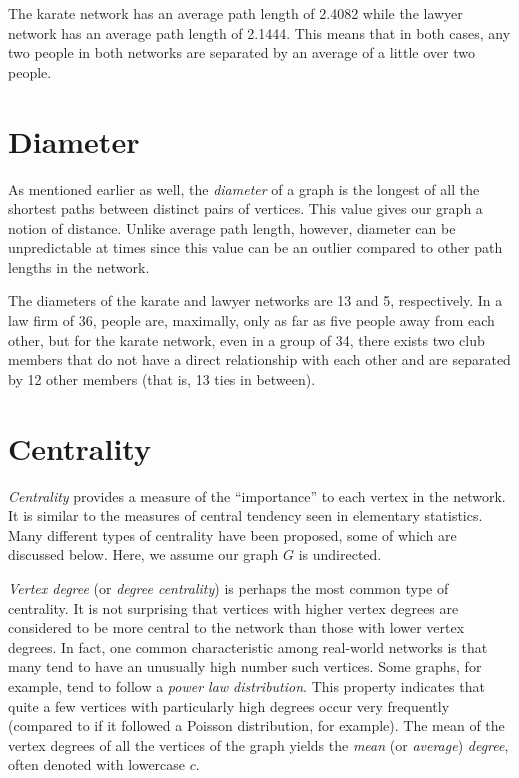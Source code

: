 \documentclass[12pt,twoside]{amherstthesis}
\begin{document}
  The karate network has an average path length of 2.4082 while the lawyer
  network has an average path length of 2.1444. This means that in both
  cases, any two people in both networks are separated by an average of a
  little over two people.
  
  \section{Diameter}\label{diameter}
  
  As mentioned earlier as well, the \emph{diameter} of a graph is the
  longest of all the shortest paths between distinct pairs of vertices.
  This value gives our graph a notion of distance. Unlike average path
  length, however, diameter can be unpredictable at times since this value
  can be an outlier compared to other path lengths in the network.
  
  The diameters of the karate and lawyer networks are 13 and 5,
  respectively. In a law firm of 36, people are, maximally, only as far as
  five people away from each other, but for the karate network, even in a
  group of 34, there exists two club members that do not have a direct
  relationship with each other and are separated by 12 other members (that
  is, 13 ties in between).
  
  \section{Centrality}\label{centrality}
  
  \emph{Centrality} provides a measure of the ``importance'' to each
  vertex in the network. It is similar to the measures of central tendency
  seen in elementary statistics. Many different types of centrality have
  been proposed, some of which are discussed below. Here, we assume our
  graph \(G\) is undirected.
  
  \emph{Vertex degree} (or \emph{degree centrality}) is perhaps the most
  common type of centrality. It is not surprising that vertices with
  higher vertex degrees are considered to be more central to the network
  than those with lower vertex degrees. In fact, one common characteristic
  among real-world networks is that many tend to have an unusually high
  number such vertices. Some graphs, for example, tend to follow a
  \emph{power law distribution}. This property indicates that quite a few
  vertices with particularly high degrees occur very frequently (compared
  to if it followed a Poisson distribution, for example). The mean of the
  vertex degrees of all the vertices of the graph yields the \emph{mean}
  (or \emph{average}) \emph{degree}, often denoted with lowercase \(c\).
  
\end{document}

